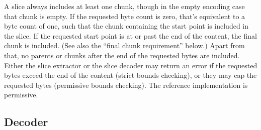\documentclass[11pt,notitlepage,a4paper]{article}
\begin{document}
A slice always includes at least one chunk, though in the empty encoding case that chunk is empty. If the requested byte count is zero, that's equivalent to a byte count of one, such that the chunk containing the start point is included in the slice. If the requested start point is at or past the end of the content, the final chunk is included. (See also the ``final chunk requirement'' below.) Apart from that, no parents or chunks after the end of the requested bytes are included. Either the slice extractor or the slice decoder may return an error if the requested bytes exceed the end of the content (strict bounds checking), or they may cap the requested bytes (permissive bounds checking). The reference implementation is permissive.

\subsection{Decoder}
\end{document}
